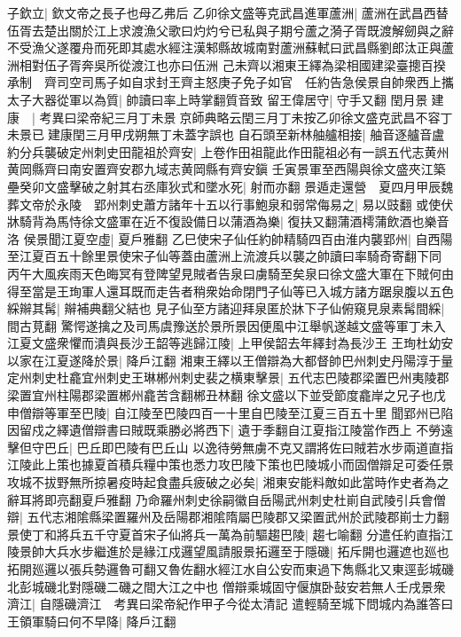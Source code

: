 子欽立|{
	欽文帝之長子也母乙弗后}
乙卯徐文盛等克武昌進軍蘆洲|{
	蘆洲在武昌西替伍胥去楚出關於江上求渡漁父歌曰灼灼兮已私與子期兮蘆之漪子胥既渡解劒與之辭不受漁父遂覆舟而死即其處水經注漢邾縣故城南對蘆洲蘇軾曰武昌縣劉郎汰正與蘆洲相對伍子胥奔吳所從渡江也亦曰伍洲}
己未齊以湘東王繹為梁相國建梁臺摠百揆承制　齊司空司馬子如自求封王齊主怒庚子免子如官　任約告急侯景自帥衆西上攜太子大器從軍以為質|{
	帥讀曰率上時掌翻質音致}
留王偉居守|{
	守手又翻}
閏月景建康　|{
	考異曰梁帝紀三月丁未景京師典略云閏三月丁未按乙卯徐文盛克武昌不容丁未景已建康閏三月甲戌朔無丁未蓋字誤也}
自石頭至新林舳艫相接|{
	舳音逐艫音盧}
約分兵襲破定州刺史田龍祖於齊安|{
	上卷作田祖龍此作田龍祖必有一誤五代志黄州黄岡縣齊曰南安置齊安郡九域志黄岡縣有齊安鎭}
壬寅景軍至西陽與徐文盛夾江築壘癸卯文盛擊破之射其右丞庫狄式和墜水死|{
	射而亦翻}
景遁走還營　夏四月甲辰魏葬文帝於永陵　郢州刺史蕭方諸年十五以行事鮑泉和弱常侮易之|{
	易以豉翻}
或使伏牀騎背為馬恃徐文盛軍在近不復設備日以蒲酒為樂|{
	復扶又翻蒲酒樗蒲飲酒也樂音洛}
侯景聞江夏空虛|{
	夏戶雅翻}
乙巳使宋子仙任約帥精騎四百由淮内襲郢州|{
	自西陽至江夏百五十餘里景使宋子仙等蓋由蘆洲上流渡兵以襲之帥讀曰率騎奇寄翻下同}
丙午大風疾雨天色晦冥有登陴望見賊者告泉曰虜騎至矣泉曰徐文盛大軍在下賊何由得至當是王珣軍人還耳既而走告者稍衆始命閉門子仙等已入城方諸方踞泉腹以五色綵辮其髯|{
	辮補典翻父結也}
見子仙至方諸迎拜泉匿於牀下子仙俯窺見泉素髯間綵|{
	間古莧翻}
驚愕遂擒之及司馬虞豫送於景所景因便風中江舉帆遂越文盛等軍丁未入江夏文盛衆懼而潰與長沙王韶等逃歸江陵|{
	上甲侯韶去年繹封為長沙王}
王珣杜幼安以家在江夏遂降於景|{
	降戶江翻}
湘東王繹以王僧辯為大都督帥巴州刺史丹陽淳于量定州刺史杜龕宜州刺史王琳郴州刺史裴之横東擊景|{
	五代志巴陵郡梁置巴州夷陵郡梁置宜州柱陽郡梁置郴州龕苦含翻郴丑林翻}
徐文盛以下並受節度龕岸之兄子也戊申僧辯等軍至巴陵|{
	自江陵至巴陵四百一十里自巴陵至江夏三百五十里}
聞郢州已陷因留戍之繹遺僧辯書曰賊既乘勝必將西下|{
	遺于季翻自江夏指江陵當作西上}
不勞遠擊但守巴丘|{
	巴丘即巴陵有巴丘山}
以逸待勞無虜不克又謂將佐曰賊若水步兩道直指江陵此上策也據夏首積兵糧中策也悉力攻巴陵下策也巴陵城小而固僧辯足可委任景攻城不拔野無所掠暑疫時起食盡兵疲破之必矣|{
	湘東安能料敵如此當時作史者為之辭耳將即亮翻夏戶雅翻}
乃命羅州刺史徐嗣徽自岳陽武州刺史杜崱自武陵引兵會僧辯|{
	五代志湘隂縣梁置羅州及岳陽郡湘隂隋屬巴陵郡又梁置武州於武陵郡崱士力翻}
景使丁和將兵五千守夏首宋子仙將兵一萬為前驅趨巴陵|{
	趨七喻翻}
分遣任約直指江陵景帥大兵水步繼進於是緣江戍邏望風請服景拓邏至于隱磯|{
	拓斥開也邏遮也廵也拓開廵邏以張兵勢邏魯可翻又魯佐翻水經江水自公安而東過下雋縣北又東逕彭城磯北彭城磯北對隱磯二磯之間大江之中也}
僧辯乘城固守偃旗卧鼔安若無人壬戌景衆濟江|{
	自隱磯濟江　考異曰梁帝紀作甲子今從太清記}
遣輕騎至城下問城内為誰答曰王領軍騎曰何不早降|{
	降戶江翻}
